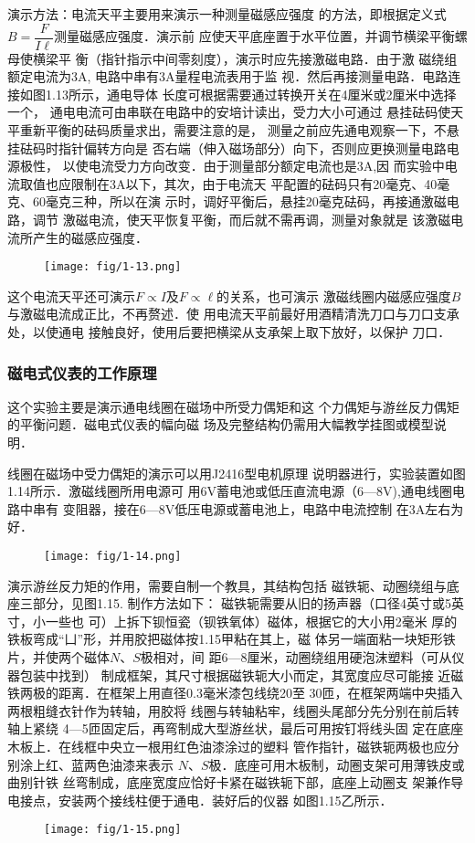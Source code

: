 演示方法：电流天平主要用来演示一种测量磁感应强度
的方法，即根据定义式$B=\dfrac{F}{I\ell}$测量磁感应强度．演示前
应使天平底座置于水平位置，并调节横梁平衡螺母使横梁平
衡（指针指示中间零刻度），演示时应先接激磁电路．由于激
磁绕组额定电流为3A, 电路中串有3A量程电流表用于监
视．然后再接测量电路．电路连接如图1.13所示，通电导体
长度可根据需要通过转换开关在4厘米或2厘米中选择一个，
通电电流可由串联在电路中的安培计读出，受力大小可通过
悬挂砝码使天平重新平衡的砝码质量求出，需要注意的是，
测量之前应先通电观察一下，不悬挂砝码时指针偏转方向是
否右端（伸入磁场部分）向下，否则应更换测量电路电源极性，
以使电流受力方向改变．由于测量部分额定电流也是3A,因
而实验中电流取值也应限制在3A以下，其次，由于电流天
平配置的砝码只有20毫克、40毫克、60毫克三种，所以在演
示时，调好平衡后，悬挂20毫克砝码，再接通激磁电路，调节
激磁电流，使天平恢复平衡，而后就不需再调，测量对象就是
该激磁电流所产生的磁感应强度．
\begin{figure}[htp]
    \centering
\texttt{[image: fig/1-13.png]}
    \caption{}
\end{figure}

这个电流天平还可演示$F\propto I$及$F\propto\ell$的关系，也可演示
激磁线圈内磁感应强度$B$与激磁电流成正比，不再赘述．使
用电流天平前最好用酒精清洗刀口与刀口支承处，以使通电
接触良好，使用后要把横梁从支承架上取下放好，以保护
刀口．

\subsubsection{磁电式仪表的工作原理}
这个实验主要是演示通电线圈在磁场中所受力偶矩和这
个力偶矩与游丝反力偶矩的平衡问题．磁电式仪表的幅向磁
场及完整结构仍需用大幅教学挂图或模型说明．

线圈在磁场中受力偶矩的演示可以用J2416型电机原理
说明器进行，实验装置如图1.14所示．激磁线圈所用电源可
用6V蓄电池或低压直流电源（6—8V),通电线圈电路中串有
变阻器，接在6—8V低压电源或蓄电池上，电路中电流控制
在3A左右为好．
\begin{figure}[htp]
    \centering
\texttt{[image: fig/1-14.png]}
    \caption{}
\end{figure}

演示游丝反力矩的作用，需要自制一个教具，其结构包括
磁铁轭、动圈绕组与底座三部分，见图1.15. 制作方法如下：
磁铁轭需要从旧的扬声器（口径4英寸或5英寸，小一些也
可）上拆下钡恒瓷（钡铁氧体）磁体，根据它的大小用2毫米
厚的铁板弯成“凵”形，并用胶把磁体按1.15甲粘在其上，磁
体另一端面粘一块矩形铁片，并使两个磁体$N$、$S$极相对，间
距6—8厘米，动圈绕组用硬泡沫塑料（可从仪器包装中找到）
制成框架，其尺寸根据磁铁轭大小而定，其宽度应尽可能接
近磁铁两极的距离．在框架上用直径0.3毫米漆包线绕20至
30匝，在框架两端中央插入两根粗缝衣针作为转轴，用胶将
线圈与转轴粘牢，线圈头尾部分先分别在前后转轴上紧绕
4—5匝固定后，再弯制成大型游丝状，最后可用按钉将线头固
定在底座木板上．在线框中央立一根用红色油漆涂过的塑料
管作指针，磁铁轭两极也应分别涂上红、蓝两色油漆来表示
$N$、$S$极．底座可用木板制，动圈支架可用薄铁皮或曲别针铁
丝弯制成，底座宽度应恰好卡紧在磁铁轭下部，底座上动圈支
架兼作导电接点，安装两个接线柱便于通电．装好后的仪器
如图1.15乙所示．
\begin{figure}[htp]
    \centering
\texttt{[image: fig/1-15.png]}
    \caption{}
\end{figure}

